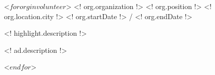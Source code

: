 \begin{cventries}
 <$ for org in volunteer $>
  \cventry
    {<! org.organization !>}
    {<! org.position !>}
    {<! org.location.city !>}
    {<! org.startDate !> / <! org.endDate !>}
    {
          \begin{cvitems}
                \item{<! highlight.description !>}
                    \begin{cvitemssub}
                        \item{<! ad.description !>}
                    \end{cvitemssub}
          \end{cvitems}
    }
 <$ endfor $>
\end{cventries}
